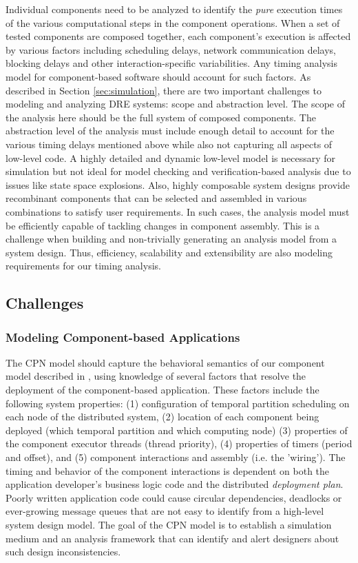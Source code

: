 Individual components need to be analyzed to identify the \emph{pure} execution times of the various computational steps in the component operations. When a set of tested components are composed together, each component's execution is affected by various factors including scheduling delays, network communication delays, blocking delays and other interaction-specific variabilities. Any timing analysis model for component-based software should account for such factors. As described in Section \ref{sec:simulation}, there are two important challenges to modeling and analyzing DRE systems: scope and abstraction level. The scope of the analysis here should be the full system of composed components. The abstraction level of the analysis must include enough detail to account for the various timing delays mentioned above while also not capturing all aspects of low-level code. A highly detailed and dynamic low-level model is necessary for simulation but not ideal for model checking and verification-based analysis due to issues like state space explosions. Also, highly composable system designs provide recombinant components that can be selected and assembled in various combinations to satisfy user requirements. In such cases, the analysis model must be efficiently capable of tackling changes in component assembly. This is a challenge when building and non-trivially generating an analysis model from a system design. Thus, efficiency, scalability and extensibility are also modeling requirements for our timing analysis.

\subsection{Challenges}

\subsubsection{Modeling Component-based Applications}

The CPN model should capture the behavioral semantics of our component model
described in \cite{ISIS_F6_ISORC:13}, using knowledge of several factors that resolve the deployment of the component-based application. These factors include the following system properties: (1) configuration of temporal partition scheduling on each node of the distributed system, (2) location of each component being deployed (which temporal partition and which computing node) (3) properties of the component executor threads (thread priority), (4) properties of timers (period and offset),
and (5) component interactions and assembly (i.e. the 'wiring'). The timing and behavior of the component interactions is dependent on both the application developer's business logic code and the distributed \emph{deployment plan}. Poorly written application code could cause circular dependencies, deadlocks or ever-growing message queues that are not easy to identify from a high-level system design model. The goal of the CPN model is to establish a simulation medium and an analysis framework that can identify and alert designers about such design inconsistencies. 

